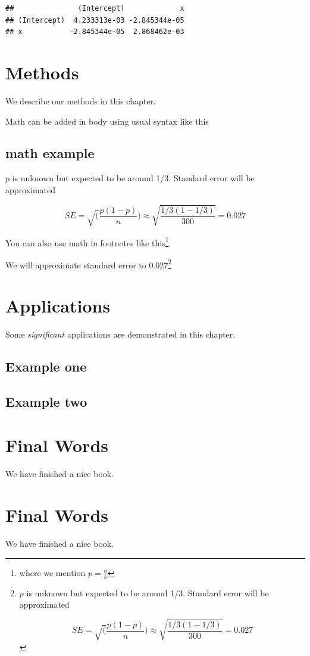 \documentclass[
]{book}
\theoremstyle{definition}
\theoremstyle{definition}
\theoremstyle{definition}
\theoremstyle{definition}
\theoremstyle{remark}
\begin{document}
\begin{verbatim}
##               (Intercept)             x
## (Intercept)  4.233313e-03 -2.845344e-05
## x           -2.845344e-05  2.868462e-03
\end{verbatim}

\hypertarget{methods}{%
\chapter{Methods}\label{methods}}

We describe our methods in this chapter.

Math can be added in body using usual syntax like this

\hypertarget{math-example}{%
\section{math example}\label{math-example}}

\(p\) is unknown but expected to be around 1/3. Standard error will be approximated

\[
SE = \sqrt(\frac{p(1-p)}{n}) \approx \sqrt{\frac{1/3 (1 - 1/3)} {300}} = 0.027
\]

You can also use math in footnotes like this\footnote{where we mention \(p = \frac{a}{b}\)}.

We will approximate standard error to 0.027\footnote{\(p\) is unknown but expected to be around 1/3. Standard error will be approximated

  \[
  SE = \sqrt(\frac{p(1-p)}{n}) \approx \sqrt{\frac{1/3 (1 - 1/3)} {300}} = 0.027
  \]}

\hypertarget{applications}{%
\chapter{Applications}\label{applications}}

Some \emph{significant} applications are demonstrated in this chapter.

\hypertarget{example-one}{%
\section{Example one}\label{example-one}}

\hypertarget{example-two}{%
\section{Example two}\label{example-two}}

\hypertarget{final-words}{%
\chapter{Final Words}\label{final-words}}

We have finished a nice book.

\hypertarget{final-words-1}{%
\chapter{Final Words}\label{final-words-1}}

We have finished a nice book.

  
\end{document}
